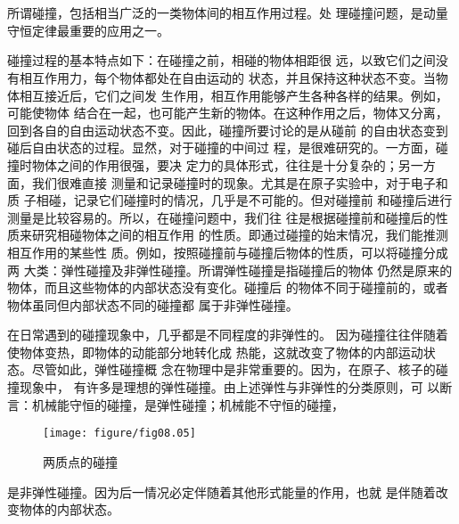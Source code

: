 \documentclass[../outline-of-mechanics.tex]{subfiles}
\begin{document}
\section[碰撞]{}\label{sec:08.03}

所谓碰撞，包括相当广泛的一类物体间的相互作用过程。处
理碰撞问题，是动量守恒定律最重要的应用之一。

碰撞过程的基本特点如下：在碰撞之前，相碰的物体相距很
远，以致它们之间没有相互作用力，每个物体都处在自由运动的
状态，并且保持这种状态不变。当物体相互接近后，它们之间发
生作用，相互作用能够产生各种各样的结果。例如，可能使物体
结合在一起，也可能产生新的物体。在这种作用之后，物体又分离，
回到各自的自由运动状态不变。因此，碰撞所要讨论的是从碰前
的自由状态变到碰后自由状态的过程。显然，对于碰撞的中间过
程，是很难研究的。一方面，碰撞时物体之间的作用很强，要决
定力的具体形式，往往是十分复杂的；另一方面，我们很难直接
测量和记录碰撞时的现象。尤其是在原子实验中，对于电子和质
子相碰，记录它们碰撞时的情况，几乎是不可能的。但对碰撞前
和碰撞后进行测量是比较容易的。所以，在碰撞问题中，我们往
往是根据碰撞前和碰撞后的性质来研究相碰物体之间的相互作用
的性质。即通过碰撞的始末情况，我们能推测相互作用的某些性
质。例如，按照碰撞前与碰撞后物体的性质，可以将碰撞分成两
大类：弹性碰撞及非弹性碰撞。所谓弹性碰撞是指碰撞后的物体
仍然是原来的物体，而且这些物体的内部状态没有变化。碰撞后
的物体不同于碰撞前的，或者物体虽同但内部状态不同的碰撞都
属于非弹性碰撞。

在日常遇到的碰撞现象中，几乎都是不同程度的非弹性的。
因为碰撞往往伴随着使物体变热，即物体的动能部分地转化成
热能，这就改变了物体的内部运动状态。尽管如此，弹性碰撞概
念在物理中是非常重要的。因为，在原子、核子的碰撞现象中，
有许多是理想的弹性碰撞。由上述弹性与非弹性的分类原则，可
以断言：机械能守恒的碰撞，是弹性碰撞；机械能不守恒的碰撞，
\begin{wrapfigure}[10]{r}{17em}
  \centering
  \texttt{[image: figure/fig08.05]}
  \caption{两质点的碰撞}
  \label{fig:08.05}
\end{wrapfigure}
是非弹性碰撞。因为后一情况必定伴随着其他形式能量的作用，也就
是伴随着改变物体的内部状态。
\end{document}
